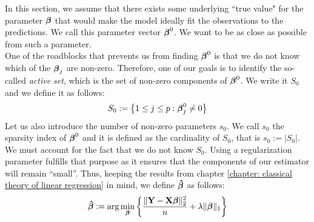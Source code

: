 In this section, we assume that there exists some underlying ``true value" for the parameter \(\boldsymbol{\beta}\) that would make the model ideally fit the observations to the predictions. We call this parameter vector \(\boldsymbol{\beta}^0\). We want to be as close as possible from such a parameter. \\
One of the roadblocks that prevents us from finding \(\boldsymbol{\beta}^0\) is that we do not know which of the \(\boldsymbol{\beta}_j\) are non-zero. Therefore, one of our goals is to identify the so-called \textit{active set}, which is the set of non-zero components of \(\boldsymbol{\beta}^0\). We write it \(S_0\) and we define it as follows:
\[
    S_0 := \left\{ 1 \leq j \leq p : \boldsymbol{\beta}_j^0 \neq 0 \right\}
\]
Let us also introduce the number of non-zero parameters \(s_0\). We call \(s_0\) the sparsity index of \(\boldsymbol{\beta}^0\) and it is defined as the cardinality of \(S_0\), that is \(s_0 := |S_0|\). \\
We must account for the fact that we do not know \(S_0\). Using a regularization parameter fulfills that purpose as it ensures that the components of our estimator will remain ``small''. Thus, keeping the results from chapter \ref{chapter: classical theory of linear regression} in mind, we define $\boldsymbol{\hat{\beta}}$ as follows:
\begin{equation}
    \label{eqn: beta hat (LASSO)}
    \boldsymbol{\hat{\beta}}:=\arg \min _{\boldsymbol{\beta}}\left\{ \frac{\|\mathbf{Y}-\mathbf{X} \boldsymbol{\beta}\|_{2}^{2}}{n}+\lambda\|\boldsymbol{\beta}\|_{1} \right\}
\end{equation}

